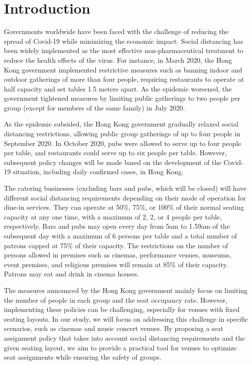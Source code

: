 \section{Introduction}

Governments worldwide have been faced with the challenge of reducing the spread of Covid-19 while minimizing the economic impact. Social distancing has been widely implemented as the most effective non-pharmaceutical treatment to reduce the health effects of the virus. For instance, in March 2020, the Hong Kong government implemented restrictive measures such as banning indoor and outdoor gatherings of more than four people, requiring restaurants to operate at half capacity and set tables 1.5 meters apart. As the epidemic worsened, the government tightened measures by limiting public gatherings to two people per group (except for members of the same family) in July 2020.

As the epidemic subsided, the Hong Kong government gradually relaxed social distancing restrictions, allowing public group gatherings of up to four people in September 2020. In October 2020, pubs were allowed to serve up to four people per table, and restaurants could serve up to six people per table. However, subsequent policy changes will be made based on the development of the Covid-19 situation, including daily confirmed cases, in Hong Kong.


The catering businesses (excluding bars and pubs, which will be closed) will have different social distancing requirements depending on their mode of operation for dine-in services. They can operate at 50\%, 75\%, or 100\% of their normal seating capacity at any one time, with a maximum of 2, 2, or 4 people per table, respectively. Bars and pubs may open every day from 5am to 1.59am of the subsequent day with a maximum of 6 persons per table and a total number of patrons capped at 75\% of their capacity. The restrictions on the number of persons allowed in premises such as cinemas, performance venues, museums, event premises, and religious premises will remain at 85\% of their capacity. Patrons may eat and drink in cinema houses. 

The measures announced by the Hong Kong government mainly focus on limiting the number of people in each group and the seat occupancy rate. However, implementing these policies can be challenging, especially for venues with fixed seating layouts. In our study, we will focus on addressing this challenge in specific scenarios, such as cinemas and music concert venues. By proposing a seat assignment policy that takes into account social distancing requirements and the given seating layout, we aim to provide a practical tool for venues to optimize seat assignments while ensuring the safety of groups.

